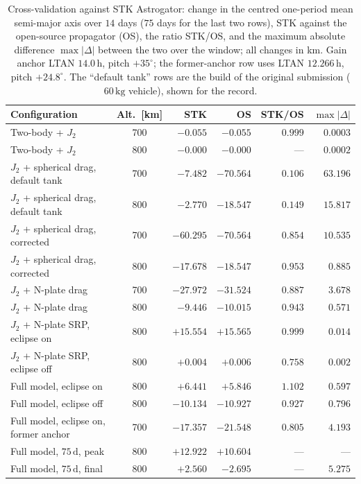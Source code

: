 \begin{table}[htbp]
\centering
\caption{Cross-validation against STK Astrogator: change in the centred one-period mean semi-major axis over \(14\) days (\(75\) days for the last two rows), STK against the open-source propagator (OS), the ratio STK/OS, and the maximum absolute difference \(\max\lvert\Delta\rvert\) between the two over the window; all changes in km. Gain anchor LTAN \(14.0\,\mathrm{h}\), pitch \(+35^\circ\); the former-anchor row uses LTAN \(12.266\,\mathrm{h}\), pitch \(+24.8^\circ\). The ``default tank'' rows are the build of the original submission (\(60\,\mathrm{kg}\) vehicle), shown for the record.}
\label{tab:stk_validation}
\vspace{0.5em}
\footnotesize
\setlength{\tabcolsep}{3pt}
\begin{tabular}{l c r r r r}
\toprule
Configuration & Alt.\ [km] & STK & OS & STK/OS & \(\max\lvert\Delta\rvert\) \\
\midrule
Two-body + \(J_2\) & 700 & \(-0.055\) & \(-0.055\) & \(0.999\) & \(0.0003\) \\
Two-body + \(J_2\) & 800 & \(-0.000\) & \(-0.000\) & --- & \(0.0002\) \\
\(J_2\) + spherical drag, default tank & 700 & \(-7.482\) & \(-70.564\) & \(0.106\) & \(63.196\) \\
\(J_2\) + spherical drag, default tank & 800 & \(-2.770\) & \(-18.547\) & \(0.149\) & \(15.817\) \\
\(J_2\) + spherical drag, corrected & 700 & \(-60.295\) & \(-70.564\) & \(0.854\) & \(10.535\) \\
\(J_2\) + spherical drag, corrected & 800 & \(-17.678\) & \(-18.547\) & \(0.953\) & \(0.885\) \\
\(J_2\) + N-plate drag & 700 & \(-27.972\) & \(-31.524\) & \(0.887\) & \(3.678\) \\
\(J_2\) + N-plate drag & 800 & \(-9.446\) & \(-10.015\) & \(0.943\) & \(0.571\) \\
\(J_2\) + N-plate SRP, eclipse on & 800 & \(+15.554\) & \(+15.565\) & \(0.999\) & \(0.014\) \\
\(J_2\) + N-plate SRP, eclipse off & 800 & \(+0.004\) & \(+0.006\) & \(0.758\) & \(0.002\) \\
Full model, eclipse on & 800 & \(+6.441\) & \(+5.846\) & \(1.102\) & \(0.597\) \\
Full model, eclipse off & 800 & \(-10.134\) & \(-10.927\) & \(0.927\) & \(0.796\) \\
Full model, eclipse on, former anchor & 700 & \(-17.357\) & \(-21.548\) & \(0.805\) & \(4.193\) \\
Full model, \(75\,\mathrm{d}\), peak & 800 & \(+12.922\) & \(+10.604\) & --- & --- \\
Full model, \(75\,\mathrm{d}\), final & 800 & \(+2.560\) & \(-2.695\) & --- & \(5.275\) \\
\bottomrule
\end{tabular}
\end{table}

